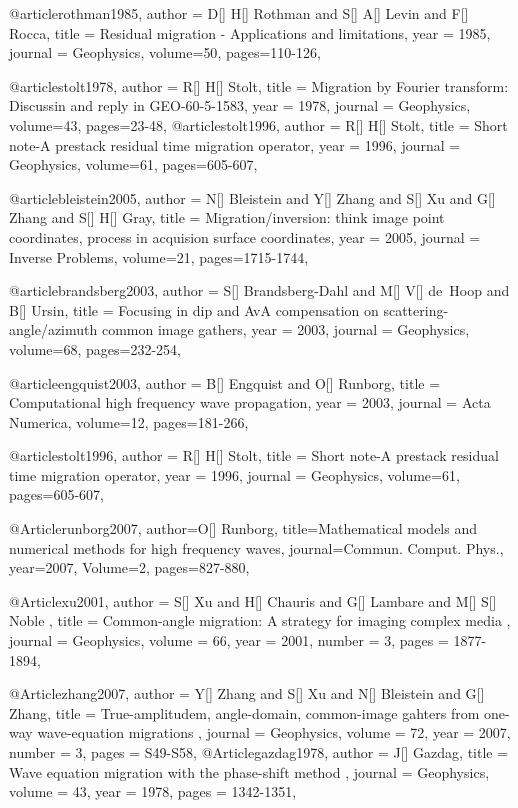 @article{rothman1985,
  author =	 {D[] H[] Rothman and S[] A[] Levin and F[] Rocca},
  title =	 {Residual  migration - Applications and limitations},
  year =	 1985,
  journal =	 {Geophysics},
  volume={50},
 pages=110-126,
}

@article{stolt1978,
  author =	 {R[] H[] Stolt},
  title =	 {Migration by {F}ourier transform: Discussin and reply in GEO-60-5-1583},
  year =	 1978,
  journal =	 {Geophysics},
  volume={43},
 pages=23-48,
}
@article{stolt1996,
  author =	 {R[] H[] Stolt},
  title =	 {Short note-A prestack residual time migration operator},
  year =	 1996,
  journal =	 {Geophysics},
  volume={61},
 pages=605-607,
}

@article{bleistein2005,
  author =	 {N[] Bleistein and Y[] Zhang and S[] Xu and G[] Zhang and S[] H[] Gray},
  title =	 {Migration/inversion: think image point coordinates, process in acquision surface coordinates},
  year =	 2005,
  journal =	 {Inverse Problems},
  volume={21},
 pages=1715-1744,
}

@article{brandsberg2003,
  author =	 {S[] Brandsberg-Dahl and M[] V[] de~Hoop and B[] Ursin},
  title =	 {Focusing in dip and AvA compensation on scattering-angle/azimuth common image gathers},
  year =	 2003,
  journal =	 {Geophysics},
  volume={68},
 pages=232-254,
}

@article{engquist2003,
  author =	 {B[] Engquist and O[] Runborg},
  title =	 {Computational high frequency wave propagation},
  year =	 2003,
  journal =	 {Acta Numerica},
  volume={12},
 pages=181-266,
}

@article{stolt1996,
  author =	 {R[] H[] Stolt},
  title =	 {Short note-A prestack residual time migration operator},
  year =	 1996,
  journal =	 {Geophysics},
  volume={61},
 pages=605-607,
}

@Article{runborg2007,
  author={O[] Runborg},
  title={Mathematical models and numerical methods for high frequency waves},
  journal={Commun. Comput. Phys.},
  year=2007,
  Volume=2,
  pages={827-880},
}

@Article{xu2001,
  author =	 { S[] Xu and H[] Chauris and G[] Lambare and M[] S[] Noble },
  title =	 { Common-angle migration: A strategy for imaging complex media },
  journal =	 {Geophysics},
  volume =	 66,
  year =	 2001,
  number =	 3,
  pages =	 {1877-1894},
}

@Article{zhang2007,
  author =	 { Y[] Zhang and S[] Xu and N[] Bleistein and G[] Zhang},
  title =	 { True-amplitudem, angle-domain, common-image gahters from one-way wave-equation migrations },
  journal =	 {Geophysics},
  volume =	 72,
  year =	 2007,
  number =	 3,
  pages =	 {S49-S58},
}
@Article{gazdag1978,
  author =	 { J[] Gazdag},
  title =	 { Wave equation migration with the phase-shift method },
  journal =	 {Geophysics},
  volume =	 43,
  year =	 1978,
  pages =	 {1342-1351},
}

